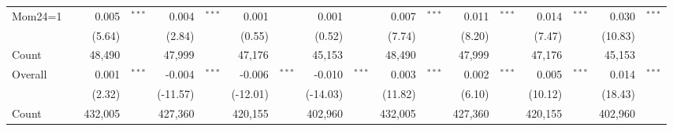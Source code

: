 \begin{landscape}
\begin{longtable}{ll*{8}{r@{}>{$}l<{$}}}
Mom24=1      &  & 0.005    & ^{***} & 0.004    & ^{***} & 0.001    &     & 0.001    &     & 0.007    & ^{***} & 0.011    & ^{***} & 0.014    & ^{***} & 0.030   & ^{***} \\* 
             &  & (5.64)   &     & (2.84)   &     & (0.55)   &     & (0.52)   &     & (7.74)   &     & (8.20)   &     & (7.47)   &     & (10.83) &     \\*
Count        &  & 48,490   &     & 47,999   &     & 47,176   &     & 45,153   &     & 48,490   &     & 47,999   &     & 47,176   &     & 45,153  &     \\  \addlinespace
Overall      &  & 0.001    & ^{***} & -0.004   & ^{***} & -0.006   & ^{***} & -0.010   & ^{***} & 0.003    & ^{***} & 0.002    & ^{***} & 0.005    & ^{***} & 0.014   & ^{***} \\*
             &  & (2.32)   &     & (-11.57) &     & (-12.01) &     & (-14.03) &     & (11.82)  &     & (6.10)   &     & (10.12)  &     & (18.43) &     \\* 
Count        &  & 432,005  &     & 427,360  &     & 420,155  &     & 402,960  &     & 432,005  &     & 427,360  &     & 420,155  &     & 402,960 &\\ \bottomrule   
\end{longtable}
\end{landscape}